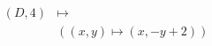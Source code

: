\documentclass[preview]{standalone}
\begin{document}
\begin{align*}
(D,4) &\mapsto \\&( (x,y) \mapsto (x, -y + 2))
\end{align*}
\end{document}
